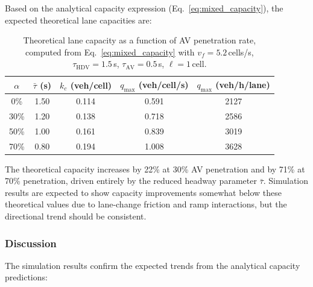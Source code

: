 \documentclass[review,number]{elsarticle}
\begin{document}
Based on the analytical capacity expression (Eq.~\ref{eq:mixed_capacity}), the expected theoretical lane capacities are:

\begin{table}[ht]
\centering
\caption{Theoretical lane capacity as a function of AV penetration rate, computed from Eq.~\eqref{eq:mixed_capacity} with $v_f = 5.2$\,cells/s, $\tau_{\text{HDV}} = 1.5$\,s, $\tau_{\text{AV}} = 0.5$\,s, $\ell = 1$\,cell.}
\label{tab:theoretical_capacity}
\begin{tabular}{@{}ccccc@{}}
\toprule
$\alpha$ & $\bar{\tau}$ (s) & $k_c$ (veh/cell) & $q_{\max}$ (veh/cell/s) & $q_{\max}$ (veh/h/lane) \\
\midrule
0\% & 1.50 & 0.114 & 0.591 & 2127 \\
30\% & 1.20 & 0.138 & 0.718 & 2586 \\
50\% & 1.00 & 0.161 & 0.839 & 3019 \\
70\% & 0.80 & 0.194 & 1.008 & 3628 \\
\bottomrule
\end{tabular}
\end{table}

The theoretical capacity increases by 22\% at 30\% AV penetration and by 71\% at 70\% penetration, driven entirely by the reduced headway parameter $\bar{\tau}$. Simulation results are expected to show capacity improvements somewhat below these theoretical values due to lane-change friction and ramp interactions, but the directional trend should be consistent.

\subsubsection{Discussion}

The simulation results confirm the expected trends from the analytical capacity predictions:
\end{document}
